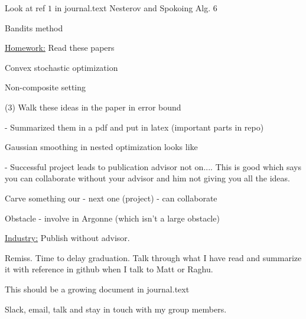 \documentclass[a4paper, 11pt]{article}
\begin{document}
Look at ref $1$ in journal.text  \newline
Nesterov and Spokoing \newline 
Alg. 6 \newline 

Bandits method \newline 

\underline{Homework:} Read these papers \newline 

Convex stochastic optimization \n 

Non-composite setting \n 

(3) Walk these ideas in the paper in error bound \n 

- Summarized them in a pdf and put in latex (important parts in repo) \n 

Gaussian smoothing in nested optimization looks like \n 

- Successful project leads to publication advisor not on.... This is good which says you can collaborate without your advisor and him not giving you all the ideas. \n 

Carve something our - next one (project) - can collaborate \n 

Obstacle - involve in Argonne (which isn't a large obstacle) \n

\underline{Industry:} Publish without advisor. \n 

Remiss. Time to delay graduation. Talk through what I have read and summarize it with reference in github when I talk to Matt or Raghu. \n 

This should be a growing document in journal.text \n 

Slack, email, talk and stay in touch with my group members. 


 
\end{document}
